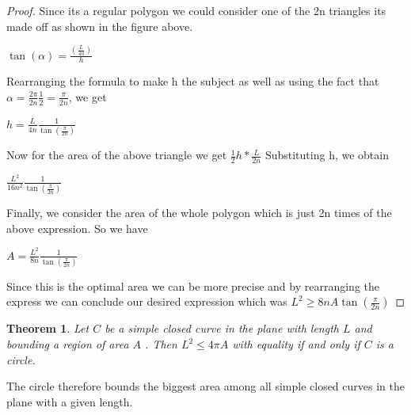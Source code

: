 \documentclass[a4paper]{book}
\newtheorem{theorem}{Theorem}%
\numberwithin{theorem}{section}%
\begin{document}
\begin{proof}
        Since its a regular polygon we could consider one of the 2n triangles its made off as shown in the figure above. 
    \begin{center}
        $\displaystyle \tan(\alpha)=\frac{(\frac{L}{4n})}{h}$
    \end{center}
        Rearranging the formula to make h the subject as well as using the fact that $\displaystyle \alpha=\frac{2\pi}{2n} \frac{1}{2}=\frac{\pi}{2n}$, we get 
    \begin{center}
        $\displaystyle h=\frac{L}{4n} \frac{1}{\tan(\frac{\pi}{2n})}$
    \end{center}
    Now for the area of the above triangle we get $\displaystyle \frac{1}{2}h*\frac{L}{2n}$
        Substituting h, we obtain
    \begin{center}
        $\displaystyle \frac{L^{2}}{16n^{2}} \frac{1}{\tan(\frac{\pi}{2n})}$
    \end{center}
        Finally, we consider the area of the whole polygon which is just 2n times of the above expression. So we have 
    \begin{center}
            $\displaystyle A=\frac{L^{2}}{8n} \frac{1}{\tan(\frac{\pi}{2n})}$
    \end{center}
        Since this is the optimal area we can be more precise and by rearranging the express we can conclude our desired expression which was $L^{2} \ge 8nA\tan(\frac{\pi}{2n})$
\end{proof}

\begin{theorem}
    Let $C$ be a simple closed curve in the plane with length $L$ and bounding a region of area $A$ . 
    Then $L^2 \leq 4\pi A$ with equality if and only if $C$ is a circle.
\end{theorem}
The circle therefore bounds the biggest area among all simple closed curves in the plane with a given length.
\end{document}
